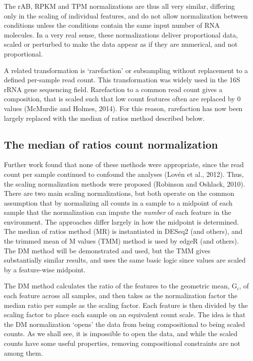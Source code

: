 \documentclass[twocolumn]{article}
\begin{document}
The rAB, RPKM and TPM normalizations are thus all very similar,
differing only in the scaling of individual features, and do not allow
normalization between conditions unless the conditions contain the same
input number of RNA molecules. In a very real sense, these
normalizations deliver proportional data, scaled or perturbed to make
the data appear as if they are numerical, and not proportional.

A related transformation is `rarefaction' or subsampling without
replacement to a defined per-sample read count. This transformation was
widely used in the 16S rRNA gene sequencing field. Rarefaction to a
common read count gives a composition, that is scaled such that low
count features often are replaced by 0 values (McMurdie and Holmes,
2014). For this reason, rarefaction has now been largely replaced with
the median of ratios method described below.

\subsection{The median of ratios count
normalization}\label{the-median-of-ratios-count-normalization}

Further work found that none of these methods were appropriate, since
the read count per sample continued to confound the analyses (Lovén et
al., 2012). Thus, the scaling normalization methods were proposed
(Robinson and Oshlack, 2010). There are two main scaling normalizations,
but both operate on the common assumption that by normalizing all counts
in a sample to a midpoint of each sample that the normalization can
impute the \emph{number} of each feature in the environment. The
approaches differ largely in how the midpoint is determined. The median
of ratios method (MR) is instantiated in DESeq2 (and others), and the
trimmed mean of M values (TMM) method is used by edgeR (and others). The
DM method will be demonstrated and used, but the TMM gives substantially
similar results, and uses the same basic logic since values are scaled
by a feature-wise midpoint.

The DM method calculates the ratio of the features to the geometric
mean, \(\mathrm{G}_i\), of each feature across all samples, and then
takes as the normalization factor the median ratio per sample as the
scaling factor. Each feature is then divided by the scaling factor to
place each sample on an equivalent count scale. The idea is that the DM
normalization `opens' the data from being compositional to being scaled
counts. As we shall see, it is impossible to open the data, and while
the scaled counts have some useful properties, removing compositional
constraints are not among them.
\end{document}
